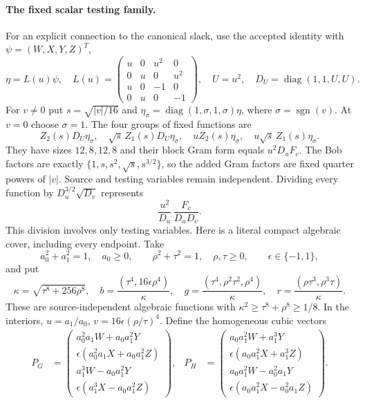 \documentclass[10pt]{article}
\newcommand{\diag}{\operatorname{diag}}
\newcommand{\sgn}{\operatorname{sgn}}
\begin{document}
\paragraph{The fixed scalar testing family.}
For an explicit connection to the canonical slack, use the accepted identity
with $\psi=(W,X,Y,Z)^T$,
\[
\eta=L(u)\psi,
\quad
L(u)=\begin{pmatrix}u&0&u^2&0\\0&u&0&u^2\\u&0&-1&0\\0&u&0&-1\end{pmatrix},
\quad U=u^2,\quad D_U=\diag(1,1,U,U).
\]
For $v\ne0$ put $s=\sqrt{|v|/16}$ and
$\eta_\sigma=\diag(1,\sigma,1,\sigma)\eta$, where $\sigma=\sgn(v)$.
At $v=0$ choose $\sigma=1$. The four groups of fixed functions are
\begin{equation}
\boxed{
Z_2(s)D_U\eta_\sigma,\quad
\sqrt{s}\,Z_1(s)D_U\eta_\sigma,\quad
uZ_2(s)\eta_\sigma,\quad
u\sqrt{s}\,Z_1(s)\eta_\sigma.}                            \label{eq:features}
\end{equation}
They have sizes $12,8,12,8$ and their block Gram form equals $u^2D_uF_c$.
The Bob factors are exactly
$\{1,s,s^2,\sqrt{s},s^{3/2}\}$, so the added Gram factors are fixed quarter
powers of $|v|$. Source and testing variables remain independent.
Dividing every function by $D_u^{3/2}\sqrt{D_v}$ represents
\begin{equation}
\frac{u^2}{D_u}\,\frac{F_c}{D_uD_v}.                       \label{eq:normalized}
\end{equation}
This division involves only testing variables. Here is a literal compact
algebraic cover, including every endpoint. Take
\[
a_0^2+a_1^2=1,\quad a_0\geq0,\qquad
\rho^2+\tau^2=1,\quad\rho,\tau\geq0,\qquad\epsilon\in\{-1,1\},
\]
and put
\[
\kappa=\sqrt{\tau^8+256\rho^8},\quad
b=\frac{(\tau^4,16\epsilon\rho^4)}{\kappa},\quad
g=\frac{(\tau^4,\rho^2\tau^2,\rho^4)}{\kappa},\quad
r=\frac{(\rho\tau^3,\rho^3\tau)}{\kappa}.
\]
These are source-independent algebraic functions with
$\kappa^2\geq\tau^8+\rho^8\geq1/8$.
In the interiors, $u=a_1/a_0$, $v=16\epsilon(\rho/\tau)^4$.
Define the homogeneous cubic vectors
\begin{align*}
P_G&=\left(\begin{smallmatrix}
a_0^2a_1W+a_0a_1^2Y\\
\epsilon(a_0^2a_1X+a_0a_1^2Z)\\
a_1^3W-a_0a_1^2Y\\
\epsilon(a_1^3X-a_0a_1^2Z)
\end{smallmatrix}\right),&
P_H&=\left(\begin{smallmatrix}
a_0a_1^2W+a_1^3Y\\
\epsilon(a_0a_1^2X+a_1^3Z)\\
a_0a_1^2W-a_0^2a_1Y\\
\epsilon(a_0a_1^2X-a_0^2a_1Z)
\end{smallmatrix}\right).
\end{align*}
\end{document}
